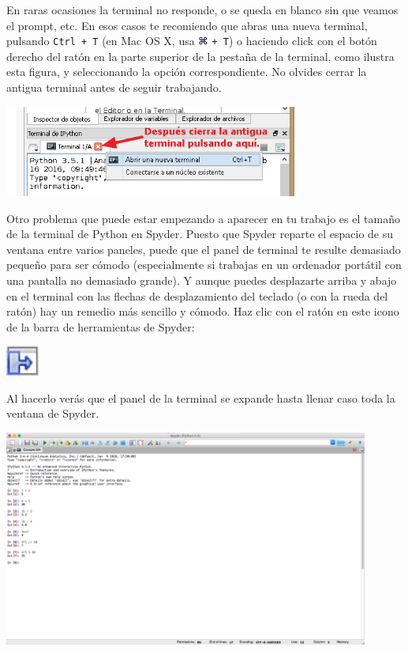 \documentclass[10pt,a4paper]{article}\usepackage[]{graphicx}\usepackage[]{color}
\begin{document}
En raras ocasiones la terminal no responde, o se queda en blanco sin que veamos el prompt, etc. En esos casos te recomiendo que abras una nueva terminal, pulsando {\tt Ctrl + T} (en Mac OS X, usa \includegraphics[height=0.3cm]{../fig/Tuts-SimboloComandoMac.png} {\tt + T}) o haciendo click con el botón derecho del ratón en la parte superior de la pestaña de la terminal, como ilustra esta figura, y seleccionando la opción correspondiente. No olvides cerrar la antigua terminal antes de seguir trabajando. 
\begin{center}
\includegraphics[height=3cm]{../fig/Tut-02-py-26-SpyderAbrirNuevaTerminal.png}
\end{center}
Otro problema que puede estar empezando a aparecer en tu trabajo es el tamaño de la terminal de Python en Spyder. Puesto que Spyder reparte el espacio de su ventana entre varios paneles, puede que el panel de terminal te resulte demasiado pequeño para ser cómodo (especialmente si trabajas en un ordenador portátil con una pantalla no demasiado grande). Y aunque puedes desplazarte arriba y abajo en el terminal con las flechas de desplazamiento del teclado (o con la rueda del ratón) hay un remedio más sencillo y cómodo. Haz clic con el ratón en este icono de la barra de herramientas de Spyder:
\begin{center}
\includegraphics[height=1cm]{../fig/Tut-02-py-19-IconoMaximizarPanel.png}
\end{center}
Al hacerlo verás que el panel de la terminal se expande hasta llenar caso toda la ventana de Spyder. 
\begin{center}
\includegraphics[width=12cm]{../fig/Tut-02-py-20-PanelTerminalMaximizado.png}
\end{center}
\end{document}
